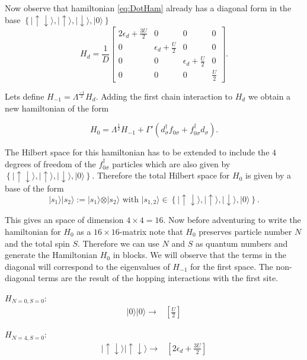 Now observe that hamiltonian \ref{eq:DotHam} already has a
diagonal form in the base $\left\{ \vert\uparrow\!\downarrow\rangle,\vert\uparrow\rangle,\vert\downarrow\rangle,\vert0\rangle\right\} $
\[
H_{d}=\frac{1}{D}\left[\begin{array}{cccc}
2\epsilon_{d}+\frac{3U}{2} & 0 & 0 & 0\\
0 & \epsilon_{d}+\frac{U}{2} & 0 & 0\\
0 & 0 & \epsilon_{d}+\frac{U}{2} & 0\\
0 & 0 & 0 & \frac{U}{2}
\end{array}\right].
\]


Lets define $H_{-1}=\Lambda^{\frac{-1}{2}}H_{d}.$ Adding the first
chain interaction to $H_{d}$ we obtain a new hamiltonian of the form 

\begin{equation}
H_{0}=\Lambda^{\frac{1}{2}}H_{-1}+\Gamma'\left(d_{\sigma}^{\dagger}f_{0\sigma}+f_{0\sigma}^{\dagger}d_{\sigma}\right).\label{eq:H0fromH-1}
\end{equation}


The Hilbert space for this hamiltonian has to be extended to include
the $4$ degrees of freedom of the $f_{0\sigma}^{\dagger}$ particles
which are also given by $\left\{ \vert\uparrow\!\downarrow\rangle,\vert\uparrow\rangle,\vert\downarrow\rangle,\vert0\rangle\right\} $.
Therefore the total Hilbert space for $H_{0}$ is given by a base
of the form 
\[
\vert s_{1}\rangle\vert s_{2}\rangle:=\vert s_{1}\rangle\otimes\vert s_{2}\rangle\mbox{ with }\vert s_{1,2}\rangle\in\left\{ \vert\uparrow\!\downarrow\rangle,\vert\uparrow\rangle,\vert\downarrow\rangle,\vert0\rangle\right\} .
\]


This gives an space of dimension $4\times4=16.$ Now before adventuring
to write the hamiltonian for $H_{0}$ as a $16\times16$-matrix note
that $H_{0}$ preserves particle number $N$ and the total spin $S$.
 Therefore we can use  $N$ and $S$ as quantum numbers and generate the Hamiltonian $H_{0}$ in blocks.
We will observe that the terms in the diagonal will correspond to
the eigenvalues of $H_{-1}$ for the first space. The non-diagonal
terms are the result of the hopping interactions with the first site. 

\begin{multicols}{2}

$H_{N=0,S=0}:$
\[
\begin{array}{c}
\vert0\rangle\vert0\rangle\rightarrow\end{array}\begin{array}{c}
\left[\frac{U}{2}\right]\end{array}
\]


$H_{N=4,S=0}:$
\[
\begin{array}{c}
\vert\uparrow\!\downarrow\rangle\vert\uparrow\!\downarrow\rangle\rightarrow\end{array}\begin{array}{c}
\left[2\epsilon_{d}+\frac{3U}{2}\right]\end{array}
\]


\end{multicols}

